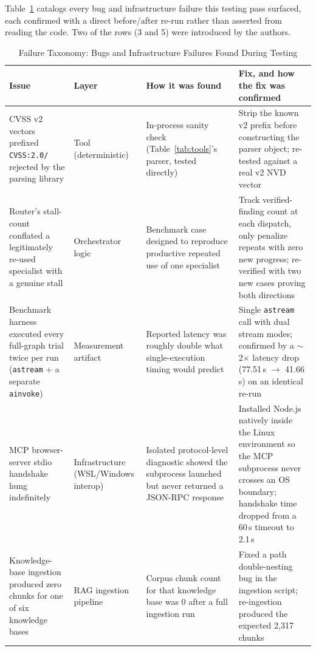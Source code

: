 \documentclass[conference]{IEEEtran}
\begin{document}
Table~\ref{tab:failures} catalogs every bug and infrastructure
failure this testing pass surfaced, each confirmed with a direct before/after
re-run rather than asserted from reading the code. Two of the rows (3 and 5) were introduced by the authors.

\begin{table}[t]
\caption{Failure Taxonomy: Bugs and Infrastructure Failures Found During Testing}
\label{tab:failures}
\centering
\begin{tabular}{@{}p{4.0cm}p{2.4cm}p{4.0cm}p{5.0cm}@{}}
\toprule
\textbf{Issue} & \textbf{Layer} & \textbf{How it was found} & \textbf{Fix, and how the fix was confirmed} \\
\midrule
CVSS v2 vectors prefixed \texttt{CVSS:2.0/} rejected by the parsing library & Tool (deterministic) & In-process sanity check (Table~\ref{tab:tools}'s parser, tested directly) & Strip the known v2 prefix before constructing the parser object; re-tested against a real v2 NVD vector \\
Router's stall-count conflated a legitimately re-used specialist with a genuine stall & Orchestrator logic & Benchmark case designed to reproduce productive repeated use of one specialist & Track verified-finding count at each dispatch, only penalize repeats with zero new progress; re-verified with two new cases proving both directions \\
Benchmark harness executed every full-graph trial twice per run (\texttt{astream} + a separate \texttt{ainvoke}) & Measurement artifact & Reported latency was roughly double what single-execution timing would predict & Single \texttt{astream} call with dual stream modes; confirmed by a $\sim$2$\times$ latency drop (77.51\,s $\to$ 41.66\,s) on an identical re-run \\
MCP browser-server stdio handshake hung indefinitely & Infrastructure (WSL/Windows interop) & Isolated protocol-level diagnostic showed the subprocess launched but never returned a JSON-RPC response & Installed Node.js natively inside the Linux environment so the MCP subprocess never crosses an OS boundary; handshake time dropped from a 60\,s timeout to 2.1\,s \\
Knowledge-base ingestion produced zero chunks for one of six knowledge bases & RAG ingestion pipeline & Corpus chunk count for that knowledge base was 0 after a full ingestion run & Fixed a path double-nesting bug in the ingestion script; re-ingestion produced the expected 2{,}317 chunks \\
\bottomrule
\end{tabular}
\end{table}
\end{document}
